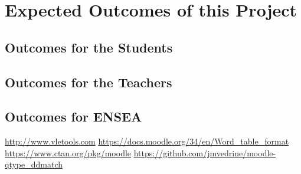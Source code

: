 \documentclass[twocolumn,a4paper,9pt]{article}
\begin{document}
\section{Expected Outcomes of this Project}

\subsection{Outcomes for the Students}

\subsection{Outcomes for the Teachers}

\subsection{Outcomes for ENSEA}

\begin{thebibliography}{9}

 \url{http://www.vletools.com}
 \url{https://docs.moodle.org/34/en/Word_table_format}
 \url{https://www.ctan.org/pkg/moodle}
 \url{https://github.com/jmvedrine/moodle-qtype_ddmatch}
\end{thebibliography}
\end{document}
